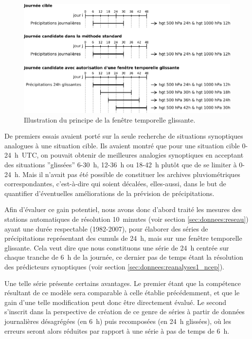 \documentclass[hess]{copernicus}
\begin{document}
\begin{figure}[htb]
	\begin{center}
		\includegraphics[width=14cm]{figures/Illustration_fenetre_glissante.pdf}
	\end{center}
	\caption[Illustration du principe de la fenêtre temporelle glissante.]{Illustration du principe de la fenêtre temporelle glissante. }
	\label{fig:Illustration_fenetre_glissante}
\end{figure}

De premiers essais \citep{Finet2008} avaient porté sur la seule recherche de situations synoptiques analogues à une situation cible. Ils avaient montré que pour une situation cible 0-24~h~UTC, on pouvait obtenir de meilleures analogies synoptiques en acceptant des situations  ''glissées'' 6-30~h, 12-36~h ou 18-42~h plutôt que de se limiter à 0-24~h. Mais il n'avait pas été possible de constituer les archives pluviométriques correspondantes, c'est-à-dire qui soient décalées, elles-aussi, dans le but de quantifier d'éventuelles améliorations de la prévision de précipitations.

Afin d'évaluer ce gain potentiel, nous avons donc d'abord traité les mesures des stations automatiques de résolution 10~minutes (voir section \ref{sec:donnees:reseau}) ayant une durée respectable (1982-2007), pour élaborer des séries de précipitations représentant des cumuls de 24~h, mais sur une fenêtre temporelle glissante. Cela veut dire que nous constituons une série de 24~h centrée sur chaque tranche de 6~h de la journée, ce dernier pas de temps étant la résolution des prédicteurs synoptiques (voir section \ref{sec:donnees:reanalyses1_ncep}). 

Une telle série présente certains avantages. Le premier étant que la compétence résultant de ce modèle sera comparable à celle établie précédemment, et que le gain d'une telle modification peut donc être directement évalué. Le second s'inscrit dans la perspective de création de ce genre de séries à partir de données journalières désagrégées (en 6~h) puis recomposées (en 24~h glissées), où les erreurs seront alors réduites par rapport à une série à pas de temps de 6~h.
\end{document}
